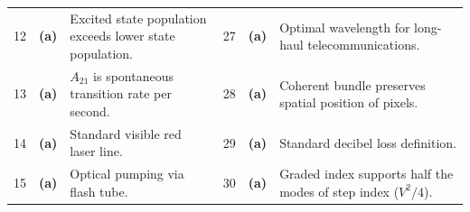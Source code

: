 \begin{table}[htbp]
\begin{tabularx}{\textwidth}{l c X l c X}
12 & \textbf{(a)} & Excited state population exceeds lower state population. & 27 & \textbf{(a)} & Optimal wavelength for long-haul telecommunications. \\
13 & \textbf{(a)} & $A_{21}$ is spontaneous transition rate per second. & 28 & \textbf{(a)} & Coherent bundle preserves spatial position of pixels. \\
14 & \textbf{(a)} & Standard visible red laser line. & 29 & \textbf{(a)} & Standard decibel loss definition. \\
15 & \textbf{(a)} & Optical pumping via flash tube. & 30 & \textbf{(a)} & Graded index supports half the modes of step index ($V^2/4$). \\
\bottomrule
\end{tabularx}
\end{table}
